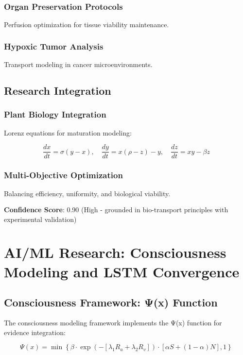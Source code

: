 \documentclass[11pt,a4paper]{article}
\begin{document}
\subsubsection{Organ Preservation Protocols}
Perfusion optimization for tissue viability maintenance.

\subsubsection{Hypoxic Tumor Analysis}
Transport modeling in cancer microenvironments.

\subsection{Research Integration}

\subsubsection{Plant Biology Integration}
Lorenz equations for maturation modeling:

\begin{equation}
\frac{dx}{dt} = \sigma(y - x), \quad \frac{dy}{dt} = x(\rho - z) - y, \quad \frac{dz}{dt} = xy - \beta z
\label{eq:lorenz}
\end{equation}

\subsubsection{Multi-Objective Optimization}
Balancing efficiency, uniformity, and biological viability.

\textbf{Confidence Score}: 0.90 (High - grounded in bio-transport principles with experimental validation)

\section{AI/ML Research: Consciousness Modeling and LSTM Convergence}
\label{sec:aiml}

\subsection{Consciousness Framework: Ψ(x) Function}

The consciousness modeling framework implements the Ψ(x) function for evidence integration:

\begin{equation}
\Psi(x) = \min\left\{\beta \cdot \exp\left(-[\lambda_1 R_a + \lambda_2 R_v]\right) \cdot [\alpha S + (1-\alpha)N], 1\right\}
\label{eq:psi_function}
\end{equation}
\end{document}
